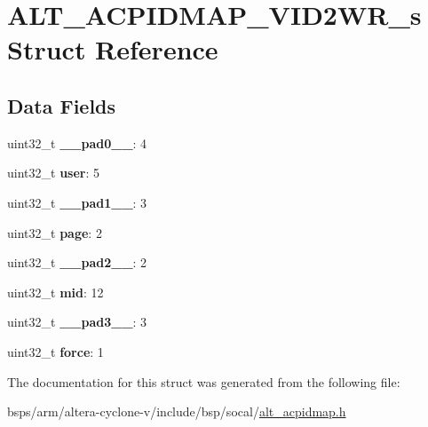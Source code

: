 \hypertarget{structALT__ACPIDMAP__VID2WR__s}{}\section{A\+L\+T\+\_\+\+A\+C\+P\+I\+D\+M\+A\+P\+\_\+\+V\+I\+D2\+W\+R\+\_\+s Struct Reference}
\label{structALT__ACPIDMAP__VID2WR__s}
\subsection*{Data Fields}
\begin{DoxyCompactItemize}
\item 
\mbox{\label{structALT__ACPIDMAP__VID2WR__s_acd8603a58d6126b54dfbe0a40f15d8e6}} 
uint32\+\_\+t {\bfseries \+\_\+\+\_\+pad0\+\_\+\+\_\+}\+: 4
\item 
\mbox{\label{structALT__ACPIDMAP__VID2WR__s_ab223a5c41368363a0615d627da3d48f8}} 
uint32\+\_\+t {\bfseries user}\+: 5
\item 
\mbox{\label{structALT__ACPIDMAP__VID2WR__s_a3e379e48ad928de3fce8e9109cc62cc0}} 
uint32\+\_\+t {\bfseries \+\_\+\+\_\+pad1\+\_\+\+\_\+}\+: 3
\item 
\mbox{\label{structALT__ACPIDMAP__VID2WR__s_a9cb6d1c87110a9526021c00fe1913f57}} 
uint32\+\_\+t {\bfseries page}\+: 2
\item 
\mbox{\label{structALT__ACPIDMAP__VID2WR__s_a5688b73c452a817b2ef1207dd96d8935}} 
uint32\+\_\+t {\bfseries \+\_\+\+\_\+pad2\+\_\+\+\_\+}\+: 2
\item 
\mbox{\label{structALT__ACPIDMAP__VID2WR__s_a27cc4d506592227310b9a974988105d4}} 
uint32\+\_\+t {\bfseries mid}\+: 12
\item 
\mbox{\label{structALT__ACPIDMAP__VID2WR__s_a7184a3b52d3b42ee6cf5c09821ff3093}} 
uint32\+\_\+t {\bfseries \+\_\+\+\_\+pad3\+\_\+\+\_\+}\+: 3
\item 
\mbox{\label{structALT__ACPIDMAP__VID2WR__s_a78c38e6b3bc149839a009eb4e6e504ea}} 
uint32\+\_\+t {\bfseries force}\+: 1
\end{DoxyCompactItemize}


The documentation for this struct was generated from the following file\+:\begin{DoxyCompactItemize}
\item 
bsps/arm/altera-\/cyclone-\/v/include/bsp/socal/\mbox{\hyperlink{alt__acpidmap_8h}{alt\+\_\+acpidmap.\+h}}\end{DoxyCompactItemize}
